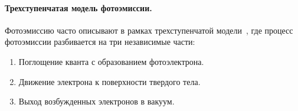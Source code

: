 \paragraph{Трехступенчатая модель фотоэмиссии.}
Фотоэмиссию часто описывают в рамках трехступенчатой модели~\cite{Hufner2019},
где процесс фотоэмиссии разбивается на три независимые части:
	\vspace{15pt}
		\begin{enumerate}
			\item Поглощение кванта с образованием фотоэлектрона.
			\item Движение электрона к поверхности твердого тела.
			\item Выход возбужденных электронов в вакуум.
		\end{enumerate}
	\vspace{15pt}


